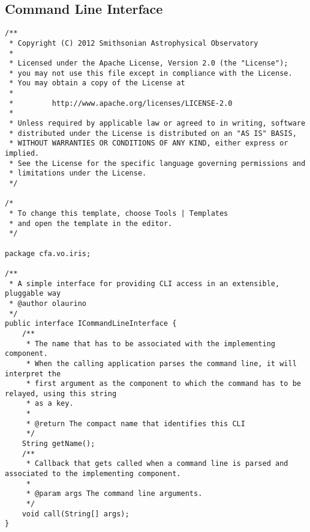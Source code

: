 \subsection{Command Line Interface}
\begin{verbatim}
/**
 * Copyright (C) 2012 Smithsonian Astrophysical Observatory
 *
 * Licensed under the Apache License, Version 2.0 (the "License");
 * you may not use this file except in compliance with the License.
 * You may obtain a copy of the License at
 *
 *         http://www.apache.org/licenses/LICENSE-2.0
 *
 * Unless required by applicable law or agreed to in writing, software
 * distributed under the License is distributed on an "AS IS" BASIS,
 * WITHOUT WARRANTIES OR CONDITIONS OF ANY KIND, either express or implied.
 * See the License for the specific language governing permissions and
 * limitations under the License.
 */

/*
 * To change this template, choose Tools | Templates
 * and open the template in the editor.
 */

package cfa.vo.iris;

/**
 * A simple interface for providing CLI access in an extensible, pluggable way
 * @author olaurino
 */
public interface ICommandLineInterface {
    /**
     * The name that has to be associated with the implementing component.
     * When the calling application parses the command line, it will interpret the
     * first argument as the component to which the command has to be relayed, using this string
     * as a key.
     *
     * @return The compact name that identifies this CLI
     */
    String getName();
    /**
     * Callback that gets called when a command line is parsed and associated to the implementing component.
     *
     * @param args The command line arguments.
     */
    void call(String[] args);
}
\end{verbatim}